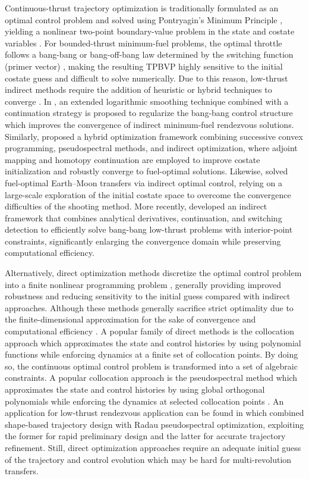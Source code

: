 \documentclass[a4paper,fleqn]{cas-sc}
\begin{document}
Continuous-thrust trajectory optimization is traditionally formulated as an optimal control problem and solved using Pontryagin’s Minimum Principle \citet{Pontryagin1962}, yielding a nonlinear two-point boundary-value problem in the state and costate variables \citet{Bryson1975}. For bounded-thrust minimum-fuel problems, the optimal throttle follows a bang-bang or bang-off-bang law determined by the switching function (primer vector) \cite{Russell2007, Prussing2010}, making the resulting TPBVP highly sensitive to the initial costate guess and difficult to solve numerically. Due to this reason, low-thrust indirect methods require the addition of heuristic or hybrid techniques to converge \citep{Morante2021}. In \citep{Taheri2016}, an extended logarithmic smoothing technique combined with a continuation strategy is proposed to regularize the bang-bang control structure which improves the convergence of indirect minimum-fuel rendezvous solutions. Similarly, \citet{Tang2018} proposed a hybrid optimization framework combining successive convex programming, pseudospectral methods, and indirect optimization, where adjoint mapping and homotopy continuation are employed to improve costate initialization and robustly converge to fuel-optimal solutions. Likewise, \citet{PerezPalau2018} solved fuel-optimal Earth–Moon transfers via indirect optimal control, relying on a large-scale exploration of the initial costate space to overcome the convergence difficulties of the shooting method. More recently, \citet{Wang2022} developed an indirect framework that combines analytical derivatives, continuation, and switching detection to efficiently solve bang-bang low-thrust problems with interior-point constraints, significantly enlarging the convergence domain while preserving computational efficiency.

Alternatively, direct optimization methods discretize the optimal control problem into a finite nonlinear programming problem \citet{Hargraves1987, Betts1998}, generally providing improved robustness and reducing sensitivity to the initial guess compared with indirect approaches. Although these methods generally sacrifice strict optimality due to the finite-dimensional approximation for the sake of convergence and computational efficiency \citep{Urrios2024}. A popular family of direct methods is the collocation approach \citep{Topputo2014} which approximates the state and control histories by using polynomial functions while enforcing dynamics at a finite set of collocation points. By doing so, the continuous optimal control problem is transformed into a set of algebraic constraints. A popular collocation approach is the pseudospectral method which approximates the state and control histories by using global orthogonal polynomials while enforcing the dynamics at selected collocation points \citep{Garg2010}. An application for low-thrust rendezvous application can be found in \citet{Li2014} which combined shape-based trajectory design with Radau pseudospectral optimization, exploiting the former for rapid preliminary design and the latter for accurate trajectory refinement. Still, direct optimization approaches require an adequate initial guess of the trajectory and control evolution which may be hard for multi-revolution transfers. 
\end{document}
